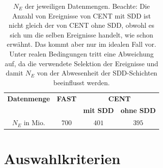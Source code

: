 \documentclass[12pt,a4paper]{report}
\begin{document}
\begin{table}
\centering
\begin{tabular}{|c||c|c|c|}
\hline
\multicolumn{1}{|c||}{\textbf{Datenmenge}} & \multicolumn{1}{|c|}{\textbf{FAST}} & \multicolumn{2}{|c|}{\textbf{CENT}} \\
\cline{3-4}
 &  & \textbf{mit SDD} & \textbf{ohne SDD} \\
\hline
\hline
$N_{E}$ in Mio. & $700$ & $401$ & $395$ \\ 
\hline
\end{tabular}
\caption{$N_{E}$ der jeweiligen Datenmengen. Beachte: Die Anzahl von Ereignisse von CENT mit SDD ist nicht gleich der von CENT ohne SDD, obwohl es sich um die selben Ereignisse handelt, wie schon erwähnt. Das kommt aber nur im idealen Fall vor. Unter realen Bedingungen tritt eine Abweichung auf, da die verwendete Selektion der Ereignisse und damit $N_{E}$ von der Abwesenheit der SDD-Schichten beeinflusst werden.}
\label{tab:CENTundFAST}
\end{table} 

\section{Auswahlkriterien}
\end{document}
